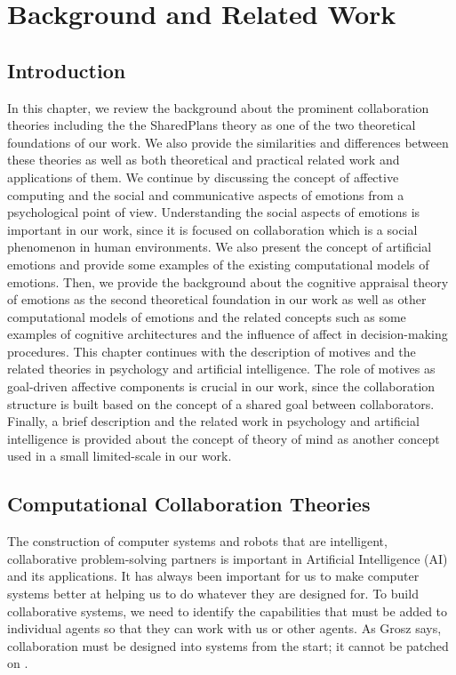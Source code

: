 \documentclass[12pt]{report}
\begin{document}
\chapter{Background and Related Work}
\label{ch:background}

\vspace*{-5mm}
\section{Introduction}
\vspace*{-3mm}
In this chapter, we review the background about the prominent collaboration
theories including the the SharedPlans theory \cite{grosz:plans-discourse} as
one of the two theoretical foundations of our work. We also provide the
similarities and differences between these theories as well as both theoretical
and practical related work and applications of them. We continue by discussing
the concept of affective computing and the social and communicative aspects of
emotions from a psychological point of view. Understanding the social aspects of
emotions is important in our work, since it is focused on collaboration which is
a social phenomenon in human environments. We also present the concept of
artificial emotions and provide some examples of the existing computational
models of emotions. Then, we provide the background about the cognitive
appraisal theory of emotions as the second theoretical foundation in our work as
well as other computational models of emotions and the related concepts such as
some examples of cognitive architectures and the influence of affect in
decision-making procedures. This chapter continues with the description of
motives and the related theories in psychology and artificial intelligence. The
role of motives as goal-driven affective components is crucial in our work,
since the collaboration structure is built based on the concept of a shared goal
between collaborators. Finally, a brief description and the related work in
psychology and artificial intelligence is provided about the concept of theory
of mind as another concept used in a small limited-scale in our work.

\section{Computational Collaboration Theories}
The construction of computer systems and robots that are intelligent,
collaborative problem-solving partners is important in Artificial Intelligence
(AI) and its applications. It has always been important for us to make computer
systems better at helping us to do whatever they are designed for. To build
collaborative systems, we need to identify the capabilities that must be added
to individual agents so that they can work with us or other agents. As Grosz
says, collaboration must be designed into systems from the start; it cannot be
patched on \cite{grosz:collaborative-systems}.
\end{document}

